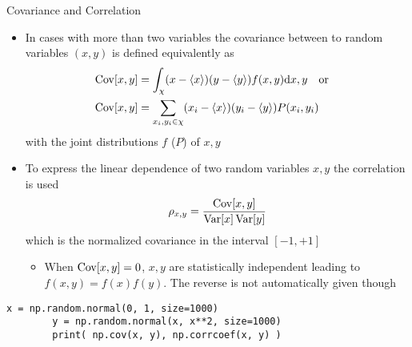   \begin{frame}[fragile]{Covariance and Correlation}
    \begin{itemize}
      \item In cases with more than two variables the covariance between to random variables $(x, y)$ is defined equivalently as
        \begin{align*}
          \operatorname{Cov}[x, y] &= \int_\chi (x-\langle x\rangle)(y-\langle y\rangle) f(x,y) \mathrm{d}x, y
          \quad\text{or}\quad \\
          \operatorname{Cov}[x, y] &= \sum_{x_i,y_i\in\chi}(x_i - \langle x\rangle)(y_i - \langle y\rangle) P(x_i, y_i)
        \end{align*}
        with the joint distributions $f$ ($P$) of $x, y$
      \item To express the linear dependence of two random variables $x, y$ the correlation is used
      \begin{equation*}
        \rho_{x,y} = \frac{\operatorname{Cov}[x, y]}{\operatorname{Var}[x]\operatorname{Var}[y]}
      \end{equation*}
      which is the normalized covariance in the interval $[-1, +1]$
      \begin{itemize}
        \item When $\operatorname{Cov}[x,y] = 0$, $x,y$ are statistically independent leading to $f(x,y) = f(x)f(y)$. The reverse is not automatically given though
      \end{itemize}
    \end{itemize}
    \begin{mdframed}
      \begin{lstlisting}[style=dark, gobble=8, title=\lsttitlelight{Cumulative distribution function for discrete PDF}]
        x = np.random.normal(0, 1, size=1000)
        y = np.random.normal(x, x**2, size=1000)
        print( np.cov(x, y), np.corrcoef(x, y) )
      \end{lstlisting}
    \end{mdframed}
  \end{frame}

